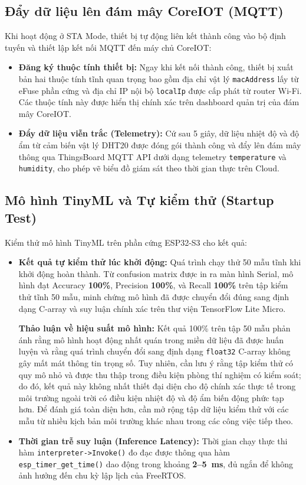 \subsection{Đẩy dữ liệu lên đám mây CoreIOT (MQTT)}
Khi hoạt động ở STA Mode, thiết bị tự động liên kết thành công vào bộ định tuyến và thiết lập kết nối MQTT đến máy chủ CoreIOT:
\begin{itemize}
    \item \textbf{Đăng ký thuộc tính thiết bị:} Ngay khi kết nối thành công, thiết bị xuất bản hai thuộc tính tĩnh quan trọng bao gồm địa chỉ vật lý \texttt{macAddress} lấy từ eFuse phần cứng và địa chỉ IP nội bộ \texttt{localIp} được cấp phát từ router Wi-Fi. Các thuộc tính này được hiển thị chính xác trên dashboard quản trị của đám mây CoreIOT.
    \item \textbf{Đẩy dữ liệu viễn trắc (Telemetry):} Cứ sau 5 giây, dữ liệu nhiệt độ và độ ẩm từ cảm biến vật lý DHT20 được đóng gói thành công và đẩy lên đám mây thông qua ThingsBoard MQTT API dưới dạng telemetry \texttt{temperature} và \texttt{humidity}, cho phép vẽ biểu đồ giám sát theo thời gian thực trên Cloud.
\end{itemize}

\subsection{Mô hình TinyML và Tự kiểm thử (Startup Test)}
Kiểm thử mô hình TinyML trên phần cứng ESP32-S3 cho kết quả:
\begin{itemize}
    \item \textbf{Kết quả tự kiểm thử lúc khởi động:} Quá trình chạy thử 50 mẫu tĩnh khi khởi động hoàn thành. Từ confusion matrix được in ra màn hình Serial, mô hình đạt Accuracy \textbf{100\%}, Precision \textbf{100\%}, và Recall \textbf{100\%} trên tập kiểm thử tĩnh 50 mẫu, minh chứng mô hình đã được chuyển đổi đúng sang định dạng C-array và suy luận chính xác trên thư viện TensorFlow Lite Micro.

\textbf{Thảo luận về hiệu suất mô hình:} Kết quả 100\% trên tập 50 mẫu phản ánh rằng mô hình hoạt động nhất quán trong miền dữ liệu đã được huấn luyện và rằng quá trình chuyển đổi sang định dạng \texttt{float32} C-array không gây mất mát thông tin trọng số. Tuy nhiên, cần lưu ý rằng tập kiểm thử có quy mô nhỏ và được thu thập trong điều kiện phòng thí nghiệm có kiểm soát; do đó, kết quả này không nhất thiết đại diện cho độ chính xác thực tế trong môi trường ngoài trời có điều kiện nhiệt độ và độ ẩm biến động phức tạp hơn. Để đánh giá toàn diện hơn, cần mở rộng tập dữ liệu kiểm thử với các mẫu từ nhiều kịch bản môi trường khác nhau trong các công việc tiếp theo.
    \item \textbf{Thời gian trễ suy luận (Inference Latency):} Thời gian chạy thực thi hàm \texttt{interpreter->Invoke()} đo đạc được thông qua hàm \texttt{esp\_timer\_get\_time()} dao động trong khoảng \textbf{2--5~ms}, đủ ngắn để không ảnh hưởng đến chu kỳ lập lịch của FreeRTOS.
\end{itemize}

